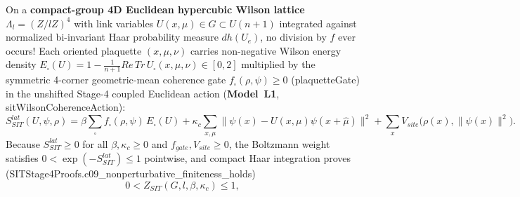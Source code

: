 \documentclass[american,11pt,letterpaper]{article}
\def\mathbb#1{#1}%
\def\mathrm#1{#1}%
\def\texttt#1{#1}%
\begin{document}
On a \textbf{compact-group 4D Euclidean hypercubic Wilson lattice} $\Lambda_l = (\mathbb{Z}/l\mathbb{Z})^4$ with link variables $U(x,\mu) \in G \subset U(n+1)$ integrated against normalized bi-invariant Haar probability measure $dh(U_e)$, no division by $f$ ever occurs! Each oriented plaquette $(x,\mu,\nu)$ carries non-negative Wilson energy density $E_\square(U) = 1 - \frac{1}{n+1}\mathrm{Re}\,\mathrm{Tr}\,U_\square(x,\mu,\nu) \in [0, 2]$ multiplied by the symmetric 4-corner geometric-mean coherence gate $f_\square(\rho,\psi) \ge 0$ (\texttt{plaquetteGate}) in the unshifted Stage-4 coupled Euclidean action (\textbf{Model~L1}, \texttt{sit\allowbreak{}Wilson\allowbreak{}Coherence\allowbreak{}Action}):
\begin{equation}
S_{\mathrm{SIT}}^{\mathrm{lat}}(U,\psi,\rho)
= \beta\sum_{\square} f_\square(\rho,\psi)\,E_\square(U)
  + \kappa_c\sum_{x,\mu}\bigl\|\psi(x) - U(x,\mu)\psi(x+\hat{\mu})\bigr\|^2
  + \sum_x V_{\mathrm{site}}\bigl(\rho(x), \|\psi(x)\|^2\bigr).
\label{eq:sec49_coupled_lattice_action}
\end{equation}
Because $S_{\mathrm{SIT}}^{\mathrm{lat}} \ge 0$ for all $\beta, \kappa_c \ge 0$ and $f_{\mathrm{gate}}, V_{\mathrm{site}} \ge 0$, the Boltzmann weight satisfies $0 < \exp(-S_{\mathrm{SIT}}^{\mathrm{lat}}) \le 1$ pointwise, and compact Haar integration proves (\texttt{SITStage4\allowbreak{}Proofs.\allowbreak{}c09\_\allowbreak{}nonperturbative\_\allowbreak{}finiteness\_\allowbreak{}holds})
\begin{equation}
0 < Z_{\mathrm{SIT}}(G, l, \beta, \kappa_c) \le 1,
\label{eq:sec49_Z_bounds}
\end{equation}
\end{document}
